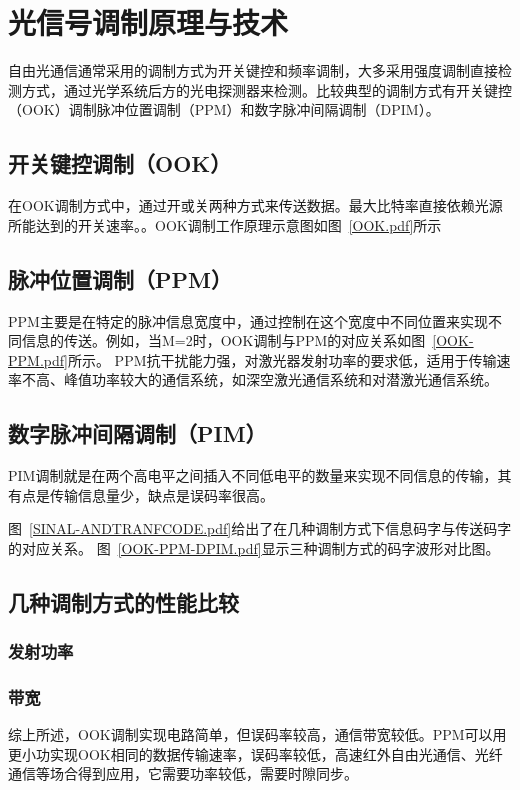 \chapter{光信号调制原理与技术}
自由光通信通常采用的调制方式为开关键控和频率调制，大多采用强度调制直接检测方式，通过光学系统后方的光电探测器来检测。比较典型的调制方式有开关键控（OOK）调制脉冲位置调制（PPM）和数字脉冲间隔调制（DPIM）。

\section{开关键控调制（OOK）}
在OOK调制方式中，通过开或关两种方式来传送数据。最大比特率直接依赖光源所能达到的开关速率。。OOK调制工作原理示意图如图~\ref{OOK.pdf}所示




\section{脉冲位置调制（PPM）}
PPM主要是在特定的脉冲信息宽度中，通过控制在这个宽度中不同位置来实现不同信息的传送。例如，当M=2时，OOK调制与PPM的对应关系如图~\ref{OOK-PPM.pdf}所示。
PPM抗干扰能力强，对激光器发射功率的要求低，适用于传输速率不高、峰值功率较大的通信系统，如深空激光通信系统和对潜激光通信系统。


\section{数字脉冲间隔调制（PIM）}
PIM调制就是在两个高电平之间插入不同低电平的数量来实现不同信息的传输，其有点是传输信息量少，缺点是误码率很高。

图~\ref{SINAL-ANDTRANFCODE.pdf}给出了在几种调制方式下信息码字与传送码字的对应关系\citep{WJ.2013.02}。
图~\ref{OOK-PPM-DPIM.pdf}显示三种调制方式的码字波形对比图。

\section{ 几种调制方式的性能比较}
\subsection{发射功率}
\subsection{带宽}
综上所述，OOK调制实现电路简单，但误码率较高，通信带宽较低。PPM可以用更小功实现OOK相同的数据传输速率，误码率较低，高速红外自由光通信、光纤通信等场合得到应用，它需要功率较低，需要时隙同步。




